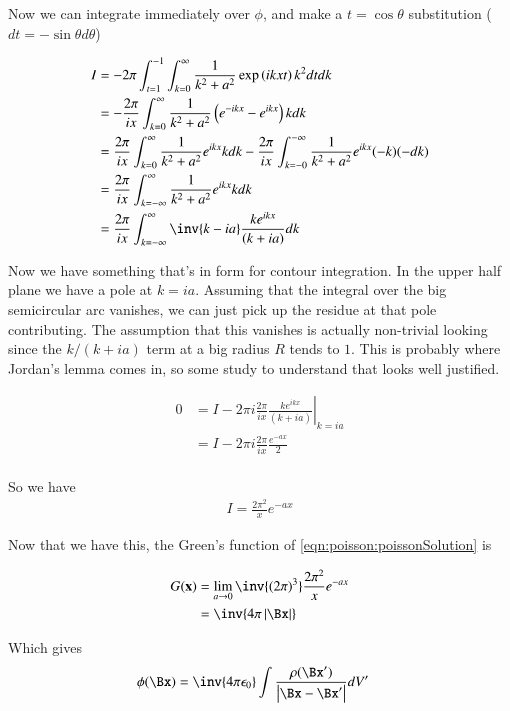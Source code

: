 Now we can integrate immediately over $\phi$, and make a $t = \cos\theta$ substitution ($dt = -\sin\theta d\theta$)

\begin{align*}
I
&= - 2\pi \int_{t=1}^{-1} \int_{k=0}^\infty \frac{1}{k^2 + a^2} \exp\left( i k x t \right) k^2 dt dk \\
&= - \frac{2\pi}{ix} \int_{k=0}^\infty \frac{1}{k^2 + a^2}
\left(
e^{-i k x } -e^{i k x }
\right)
k dk \\
&= \frac{2\pi}{ix} \int_{k=0}^\infty \frac{1}{k^2 + a^2}
e^{i k x }
k dk
- \frac{2\pi}{ix} \int_{k=-0}^{-\infty} \frac{1}{k^2 + a^2}
e^{i k x }
(-k) (-dk) \\
&= \frac{2\pi}{ix} \int_{k=-\infty}^\infty \frac{1}{k^2 + a^2} e^{i k x } k dk \\
&= \frac{2\pi}{ix} \int_{k=-\infty}^\infty \inv{k - ia} \frac{ k e^{ i k x } }{(k + ia)} dk \\
\end{align*}

Now we have something that's in form for contour integration.  In the upper half plane we have a pole at $k= ia$.  Assuming that the
integral over the big semicircular arc vanishes, we can just pick up the residue at that pole contributing.  The assumption that
this vanishes is actually non-trivial looking since the $k/(k+ia)$ term at a big radius $R$ tends to $1$.  This is probably where
Jordan's lemma comes in, so some study to understand that looks well justified.

\begin{align*}
0
&= I - 2 \pi i {\left. \frac{2\pi}{ix} \frac{ k e^{ i k x } }{(k + ia)} \right\vert}_{k= ia} \\
&= I - 2 \pi i \frac{2\pi}{ix} \frac{ e^{ - a x } }{2} \\
\end{align*}

So we have
\begin{align*}
I = \frac{2 \pi^2}{x} e^{ - a x }
\end{align*}

Now that we have this, the Green's function of \ref{eqn:poisson:poissonSolution} is

\begin{align*}
G(\mathbf{x})
&= \lim_{a \rightarrow 0} \inv{(2\pi)^3} \frac{2 \pi^2}{x} e^{ - a x } \\
&= \inv{4\pi\Abs{\Bx}}
\end{align*}

Which gives
\begin{align*}
\phi(\Bx) &= \inv{4\pi \epsilon_0} \int \frac{\rho(\Bx')}{\Abs{\Bx - \Bx'}} dV'
\end{align*}

